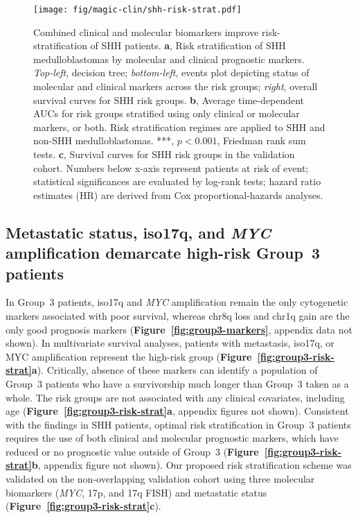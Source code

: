 \documentclass[11pt,letterpaper]{article}
\theoremstyle{definition}
\newcommand{\emphlab}[1]{\textbf{\textsf{#1}}}
\newcommand{\citefig}[1]{\emphlab{Figure~\ref{fig:#1}}}
\begin{document}
\clearpage

\begin{figure}[h]
	\begin{center}
		\texttt{[image: fig/magic-clin/shh-risk-strat.pdf]}
	\end{center}
	\caption[Combined clinical and molecular biomarkers improve risk-stratification of SHH patients]
	{
	Combined clinical and molecular biomarkers improve risk-stratification of SHH patients.
	\textbf{a}, Risk stratification of SHH medulloblastomas by molecular and clinical prognostic markers. \emph{Top-left}, decision tree; \emph{bottom-left}, events plot depicting status of molecular and clinical markers across the risk groups; \emph{right}, overall survival curves for SHH risk groups.
	\textbf{b}, Average time-dependent AUCs for risk groups stratified using only clinical or molecular markers, or both. Risk stratification regimes are applied to SHH and non-SHH medulloblastomas. ***, $p < 0.001$, Friedman rank sum tests.
	\textbf{c}, Survival curves for SHH risk groups in the validation cohort.
	Numbers below x-axis represent patients at risk of event; statistical significances are evaluated by log-rank tests; hazard ratio estimates (HR) are derived from Cox proportional-hazards analyses.
	}
	\label{fig:shh-risk-strat}
\end{figure}

\clearpage

\subsection{Metastatic status, iso17q, and \emph{MYC} amplification demarcate high-risk Group~3 patients}

In Group~3 patients, iso17q and \emph{MYC} amplification remain the only cytogenetic markers associated with poor survival, whereas chr8q loss and chr1q gain are the only good prognosis markers (\citefig{group3-markers}, appendix data not shown). In multivariate survival analyses, patients with metastasis, iso17q, or MYC amplification represent the high-risk group (\citefig{group3-risk-strat}\emphlab{a}). Critically, absence of these markers can identify a population of Group~3 patients who have a survivorship much longer than Group~3 taken as a whole. The risk groups are not associated with any clinical covariates, including age (\citefig{group3-risk-strat}\emphlab{a}, appendix figures not shown). Consistent with the findings in SHH patients, optimal risk stratification in Group~3 patients requires the use of both clinical and molecular prognostic markers, which have reduced or no prognostic value outside of Group~3 (\citefig{group3-risk-strat}\emphlab{b}, appendix figure not shown). Our proposed risk stratification scheme was validated on the non-overlapping validation cohort using three molecular biomarkers (\emph{MYC}, 17p, and 17q FISH) and metastatic status (\citefig{group3-risk-strat}\emphlab{c}).
\end{document}
